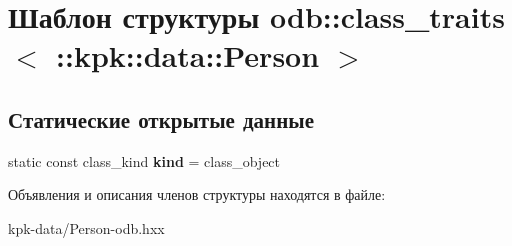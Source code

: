 \hypertarget{structodb_1_1class__traits_3_01_1_1kpk_1_1data_1_1_person_01_4}{}\section{Шаблон структуры odb\+:\+:class\+\_\+traits$<$ \+:\+:kpk\+:\+:data\+:\+:Person $>$}
\label{structodb_1_1class__traits_3_01_1_1kpk_1_1data_1_1_person_01_4}
\subsection*{Статические открытые данные}
\begin{DoxyCompactItemize}
\item 
static const class\+\_\+kind {\bfseries kind} = class\+\_\+object\hypertarget{structodb_1_1class__traits_3_01_1_1kpk_1_1data_1_1_person_01_4_aef245c778a7cccbc30c58e2738feea13}{}\label{structodb_1_1class__traits_3_01_1_1kpk_1_1data_1_1_person_01_4_aef245c778a7cccbc30c58e2738feea13}

\end{DoxyCompactItemize}


Объявления и описания членов структуры находятся в файле\+:\begin{DoxyCompactItemize}
\item 
kpk-\/data/Person-\/odb.\+hxx\end{DoxyCompactItemize}
